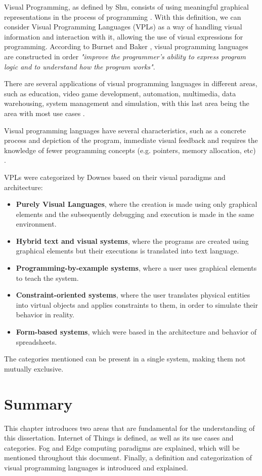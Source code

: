 Visual Programming, as defined by Shu, consists of using meaningful graphical representations in the process of programming \cite{vpl_definition_shu}. With this definition, we can consider Visual Programming Languages (VPLs) as a way of handling visual information and interaction with it, allowing the use of visual expressions for programming. According to Burnet and Baker \cite{scaling_vpls}, visual programming languages are constructed in order \emph{"improve the programmer's ability to express program logic and to understand how the program works"}.
\par There are several applications of visual programming languages in different areas, such as education, video game development, automation, multimedia, data warehousing, system management and simulation, with this last area being the area with most use cases \cite{survey_vpl_iot}.
\par Visual programming languages have several characteristics, such as a concrete process and depiction of the program, immediate visual feedback and requires the knowledge of fewer programming concepts (e.g. pointers, memory allocation, etc) \cite{scaling_vpls}.
\par VPLs were categorized by Downes \cite{vpls_survey} based on their visual paradigms and architecture: 
\begin{itemize}
    \item \textbf{Purely Visual Languages}, where the creation is made using only graphical elements and the subsequently debugging and execution is made in the same environment.
    \item \textbf{Hybrid text and visual systems}, where the programs are created using graphical elements but their executions is translated into text language.
    \item \textbf{Programming-by-example systems}, where a user uses graphical elements to teach the system.
    \item \textbf{Constraint-oriented systems}, where the user translates physical entities into virtual objects and applies constraints to them, in order to simulate their behavior in reality.
    \item \textbf{Form-based systems}, which were based in the architecture and behavior of spreadsheets.
\end{itemize}
The categories mentioned can be present in a single system, making them not mutually exclusive.

\section{Summary}

This chapter introduces two areas that are fundamental for the understanding of this dissertation. Internet of Things is defined, as well as its use cases and categories. Fog and Edge computing paradigms are explained, which will be mentioned throughout this document. Finally, a definition and categorization of visual programming languages is introduced and explained.
